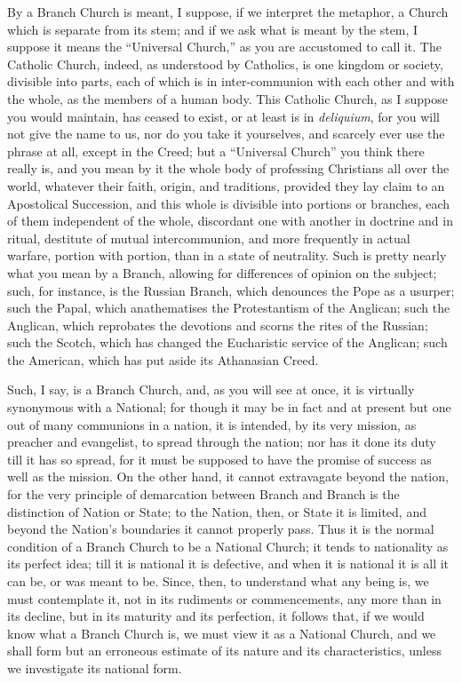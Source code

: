 By a Branch Church is meant, I suppose, if we interpret the
metaphor, a Church which is separate from its stem; and if we ask what
is meant by the stem, I suppose it means the ``Universal
Church,'' as you are accustomed to call it. The Catholic Church,
indeed, as understood by Catholics, is one kingdom or society,
divisible into parts, each of which is in inter-communion with each
other and with the whole, as the members of a human body. This
Catholic Church, as I suppose you would maintain, has ceased to exist,
or at least is in \emph{deliquium}, for you will not give the name to
us, nor do you take it yourselves, and scarcely ever use the phrase at
all, except in the Creed; but a ``Universal Church'' you think
there really is, and you mean by it the whole body of professing
Christians all over the world, whatever their faith, origin, and
traditions, provided they lay claim to an Apostolical Succession, and
this whole is divisible into portions or branches, each of them
independent of the whole, discordant one with another in doctrine and
in ritual, destitute of mutual intercommunion, and more frequently in
actual warfare, portion with portion, than in a state of neutrality.
Such is pretty nearly what you mean by a Branch, allowing for
differences of opinion on the subject; such, for instance, is the
Russian Branch, which denounces the Pope as a usurper; such the Papal,
which anathematises the Protestantism of the Anglican; such the
Anglican, which reprobates the devotions and scorns the rites of the
Russian; such the Scotch, which has changed the Eucharistic service of
the Anglican; such the American, which has put aside its Athanasian
Creed.

Such, I say, is a Branch Church, and, as you will see at once, it
is virtually synonymous with a National; for though it may be in fact
and at present but one out of many communions in a nation, it is
intended, by its very mission, as preacher and evangelist, to spread
through the nation; nor has it done its duty till it has so spread,
for it must be supposed to have the promise of success as well as the
mission. On the other hand, it cannot extravagate beyond the nation,
for the very principle of demarcation between Branch and Branch is the
distinction of Nation or State; to the Nation, then, or State it is
limited, and beyond the Nation's boundaries it cannot properly pass.
Thus it is the normal condition of a Branch Church to be a National
Church; it tends to nationality as its perfect idea; till it is
national it is defective, and when it is national it is all it can be,
or was meant to be. Since, then, to understand what any being is, we
must contemplate it, not in its rudiments or commencements, any more
than in its decline, but in its maturity and its perfection, it
follows that, if we would know what a Branch Church is, we must view
it as a National Church, and we shall form but an erroneous estimate
of its nature and its characteristics, unless we investigate its
national form.

